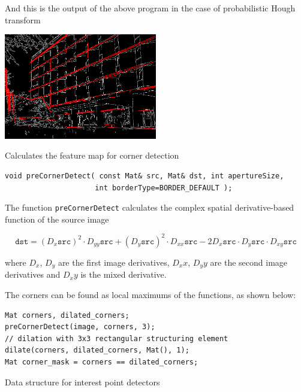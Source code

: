 And this is the output of the above program in the case of probabilistic Hough transform

\includegraphics[width=0.5\textwidth]{pics/houghp.png}

\label{perCornerDetect}
Calculates the feature map for corner detection

\begin{lstlisting}
void preCornerDetect( const Mat& src, Mat& dst, int apertureSize,
                     int borderType=BORDER_DEFAULT );
\end{lstlisting}
\begin{description}
\end{description}

The function \texttt{preCornerDetect} calculates the complex spatial derivative-based function of the source image

\[
\texttt{dst} = (D_x \texttt{src})^2 \cdot D_{yy} \texttt{src} + (D_y \texttt{src})^2 \cdot D_{xx} \texttt{src} - 2 D_x \texttt{src} \cdot D_y \texttt{src} \cdot D_{xy} \texttt{src}
\]

where $D_x$, $D_y$ are the first image derivatives, $D_xx$, $D_yy$ are the second image derivatives and $D_xy$ is the mixed derivative.

The corners can be found as local maximums of the functions, as shown below:

\begin{lstlisting}
Mat corners, dilated_corners;
preCornerDetect(image, corners, 3);
// dilation with 3x3 rectangular structuring element
dilate(corners, dilated_corners, Mat(), 1);
Mat corner_mask = corners == dilated_corners;
\end{lstlisting}


\label{KeyPoint}
Data structure for interest point detectors

